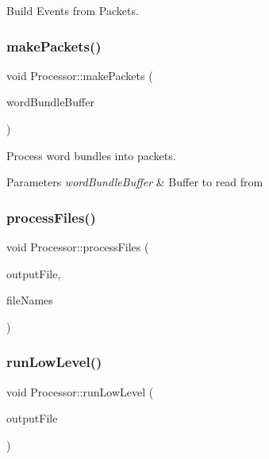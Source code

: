 Build Events from Packets. 

\mbox{\label{class_processor_a554de487c5e8205872151fbedb315291}} 
\subsubsection{\texorpdfstring{make\+Packets()}{makePackets()}}
{\footnotesize\ttfamily void Processor\+::make\+Packets (\begin{DoxyParamCaption}\item[{std\+::shared\+\_\+ptr$<$ \hyperlink{class_processor_a531b4c5f7c0d810fc6e9e1dd3d115725}{bundle\+Buffer} $>$}]{word\+Bundle\+Buffer }\end{DoxyParamCaption})\hspace{0.3cm}{\ttfamily [private]}}



Process word bundles into packets. 


\begin{DoxyParams}{Parameters}
{\em word\+Bundle\+Buffer} & Buffer to read from \\
\hline
\end{DoxyParams}
\mbox{\label{class_processor_ad3862d616c58f790ab6d3e9725ce5b10}} 
\subsubsection{\texorpdfstring{process\+Files()}{processFiles()}}
{\footnotesize\ttfamily void Processor\+::process\+Files (\begin{DoxyParamCaption}\item[{const std\+::string}]{output\+File,  }\item[{const std\+::vector$<$ std\+::string $>$}]{file\+Names }\end{DoxyParamCaption})}

\mbox{\label{class_processor_a3710adfb2311c70d9402e25a8615ace4}} 
\subsubsection{\texorpdfstring{run\+Low\+Level()}{runLowLevel()}}
{\footnotesize\ttfamily void Processor\+::run\+Low\+Level (\begin{DoxyParamCaption}\item[{const std\+::string}]{output\+File }\end{DoxyParamCaption})\hspace{0.3cm}{\ttfamily [private]}}



